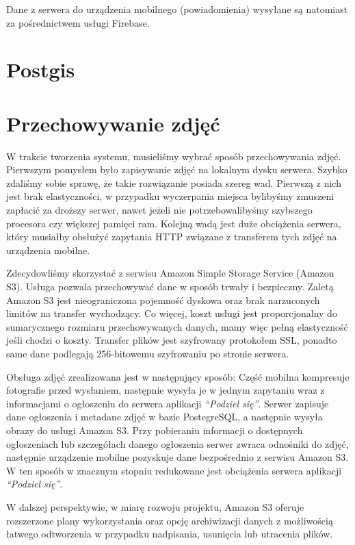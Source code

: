 \documentclass[licencjacka]{pracamgr}
\begin{document}
Dane z serwera do urządzenia mobilnego (powiadomienia) wysyłane są natomiast za pośrednictwem usługi Firebase.

\section{Postgis}

\section{Przechowywanie zdjęć} 

W trakcie tworzenia systemu, musieliśmy wybrać sposób przechowywania zdjęć. Pierwszym pomysłem było zapisywanie zdjęć na lokalnym dysku serwera. Szybko zdaliśmy sobie sprawę, że takie rozwiązanie posiada szereg wad. Pierwszą z nich jest brak elastyczności, w przypadku wyczerpania miejsca bylibyśmy zmuszeni zapłacić za droższy serwer, nawet jeżeli nie potrzebowalibyśmy szybszego procesora czy większej pamięci ram. Kolejną wadą jest duże obciążenia serwera, który musiałby obsłużyć zapytania HTTP związane z transferem tych zdjęć na urządzenia mobilne. 

Zdecydowliśmy skorzystać z serwisu Amazon Simple Storage Service (Amazon S3). Usługa pozwala przechowywać dane w sposób trwały i bezpieczny. Zaletą Amazon S3 jest nieograniczona pojemność dyskowa oraz brak narzuconych limitów na transfer wychodzący. Co więcej, koszt usługi jest proporcjonalny do sumarycznego rozmiaru przechowywanych danych, mamy więc pełną elastyczność jeśli chodzi o koszty. Transfer plików jest szyfrowany protokołem SSL, ponadto same dane podlegają 256-bitowemu szyfrowaniu po stronie serwera.

Obsługa zdjęć zrealizowana jest w następujący sposób: Część mobilna kompresuje fotografie przed wysłaniem, następnie wysyła je w jednym zapytaniu wraz z informacjami o ogłoszeniu do serwera aplikacji \textit{``Podziel się''}. Serwer zapisuje dane ogłoszenia i metadane zdjęć w bazie PostegreSQL, a następnie wysyła obrazy do usługi Amazon S3. Przy pobieraniu informacji o dostępnych ogłoszeniach lub szczegółach danego ogłoszenia serwer zwraca odnośniki do zdjęć, następnie urządzenie mobilne pozyskuje dane bezpośrednio z serwisu Amazon S3. W ten sposób w znacznym stopniu redukowane jest obciążenia serwera aplikacji \textit{``Podziel się''}.

W dalszej perspektywie, w miarę rozwoju projektu, Amazon S3 oferuje rozszerzone plany wykorzystania oraz opcję archiwizacji danych z możliwością łatwego odtworzenia w przypadku nadpisania, usunięcia lub utracenia plików.
\end{document}
